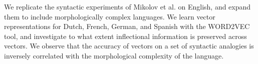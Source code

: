 We replicate the syntactic experiments of Mikolov et al. on English, and expand them to include morphologically complex languages. We learn vector representations for Dutch, French, German, and Spanish with the WORD2VEC tool, and investigate to what extent inflectional information is preserved across vectors. We observe that the accuracy of vectors on a set of syntactic analogies is inversely correlated with the morphological complexity of the language.
